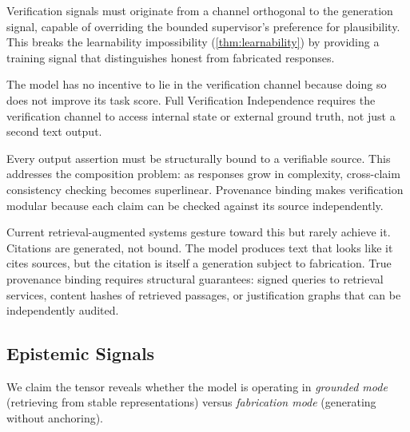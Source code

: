 \begin{principle}
Verification signals must originate from a channel orthogonal to the generation
signal, capable of overriding the bounded supervisor's preference for
plausibility. This breaks the learnability impossibility
(\autoref{thm:learnability}) by providing a training signal that distinguishes
honest from fabricated responses.
\end{principle}

The model has no incentive to lie in the verification channel because doing so
does not improve its task score. 
Full Verification Independence requires the verification channel to
access internal state or external ground truth, not just a second text output.

\begin{principle}
Every output assertion must be structurally bound to a verifiable source. This
addresses the composition problem: as responses grow in complexity, cross-claim
consistency checking becomes superlinear. Provenance binding makes verification
modular because each claim can be checked against its source independently.
\end{principle}

Current retrieval-augmented systems gesture toward this but rarely achieve it.
Citations are generated, not bound. The model produces text that looks like it
cites sources, but the citation is itself a generation subject to fabrication.
True provenance binding requires structural guarantees: signed queries to
retrieval services, content hashes of retrieved passages, or justification
graphs that can be independently audited.

\subsection{Epistemic Signals}

We claim the tensor reveals whether the
model is operating in \emph{grounded mode} (retrieving from stable
representations) versus \emph{fabrication mode} (generating without anchoring).


